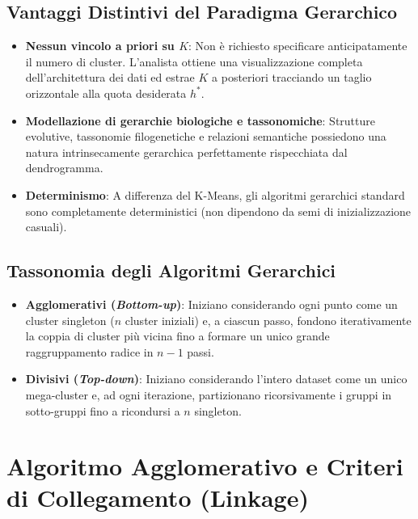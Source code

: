 \subsection{Vantaggi Distintivi del Paradigma Gerarchico}

\begin{itemize}
    \item \textbf{Nessun vincolo a priori su $K$}: Non è richiesto specificare anticipatamente il numero di cluster. L'analista ottiene una visualizzazione completa dell'architettura dei dati ed estrae $K$ a posteriori tracciando un taglio orizzontale alla quota desiderata $h^*$.
    \item \textbf{Modellazione di gerarchie biologiche e tassonomiche}: Strutture evolutive, tassonomie filogenetiche e relazioni semantiche possiedono una natura intrinsecamente gerarchica perfettamente rispecchiata dal dendrogramma.
    \item \textbf{Determinismo}: A differenza del K-Means, gli algoritmi gerarchici standard sono completamente deterministici (non dipendono da semi di inizializzazione casuali).
\end{itemize}

\subsection{Tassonomia degli Algoritmi Gerarchici}

\begin{itemize}
    \item \textbf{Agglomerativi (\textit{Bottom-up})}: Iniziano considerando ogni punto come un cluster singleton ($n$ cluster iniziali) e, a ciascun passo, fondono iterativamente la coppia di cluster più vicina fino a formare un unico grande raggruppamento radice in $n - 1$ passi.
    \item \textbf{Divisivi (\textit{Top-down})}: Iniziano considerando l'intero dataset come un unico mega-cluster e, ad ogni iterazione, partizionano ricorsivamente i gruppi in sotto-gruppi fino a ricondursi a $n$ singleton.
\end{itemize}

\section{Algoritmo Agglomerativo e Criteri di Collegamento (Linkage)}
\label{sec:dm-agglomerative-linkage-criteria}

